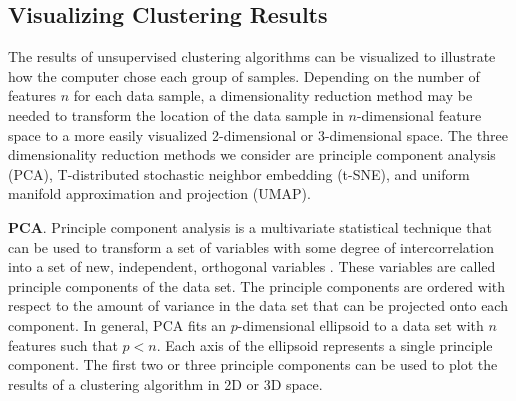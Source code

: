 %
%
%

\subsection{Visualizing Clustering Results} 

The results of unsupervised clustering algorithms can be visualized to illustrate how the computer chose each group of samples. Depending on the number of features $n$ for each data sample, a dimensionality reduction method may be needed to transform the location of the data sample in $n$-dimensional feature space to a more easily visualized 2-dimensional or 3-dimensional space. The three dimensionality reduction methods we consider are principle component analysis (PCA), T-distributed stochastic neighbor embedding (t-SNE), and uniform manifold approximation and projection (UMAP).

\textbf{PCA}. Principle component analysis is a multivariate statistical technique that can be used to transform a set of variables with some degree of intercorrelation into a set of new, independent, orthogonal variables \cite{Abdi2010}. These variables are called principle components of the data set. The principle components are ordered with respect to the amount of variance in the data set that can be projected onto each component. In general, PCA fits an $p$-dimensional ellipsoid to a data set with $n$ features such that $p < n$. Each axis of the ellipsoid represents a single principle component. The first two or three principle components can be used to plot the results of a clustering algorithm in 2D or 3D space.

